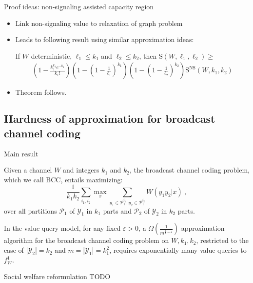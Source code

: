 \documentclass{beamer}
\theoremstyle{definition}
\theoremstyle{remark}
\begin{document}
\begin{frame}{Proof ideas: non-signaling assisted capacity region}
  \begin{itemize}
  \item Link non-signaling value to relaxation of graph problem
  \item Leads to following result using similar approximation ideas:
    \begin{theorem}
      \label{theo:NSdet}
      If $W$ deterministic, $\ell_1 \leq k_1$ and $\ell_2 \leq k_2$, then $\mathrm{S}(W,\ell_1,\ell_2) \geq$
      \begin{align*}
        \left(1 - \frac{k_1^{k_1}e^{-k_1}}{k_1!}\right)\left(1-\left(1-\frac{1}{\ell_1}\right)^{k_1}\right)\left(1-\left(1-\frac{1}{\ell_2}\right)^{k_2}\right)\mathrm{S}^{\mathrm{NS}}(W,k_1,k_2)
      \end{align*}
    \end{theorem}
  \item Theorem follows.
  \end{itemize}
\end{frame}

\subsection{Hardness of approximation for broadcast channel coding}
\begin{frame}{Main result}
  \begin{definition}
  Given a channel $W$ and integers $k_1$ and $k_2$, the broadcast channel coding problem, which we call \textsc{BCC}, entails maximizing:
  \[ \frac{1}{k_1k_2}\sum_{i_1,i_2} \max_x \sum_{y_1 \in \mathcal{P}_1^{i_1}, y_2 \in \mathcal{P}_1^{i_2}} W(y_1y_2|x) \ , \]
  over all partitions $\mathcal{P}_1$ of $\mathcal{Y}_1$ in $k_1$ parts and $\mathcal{P}_2$ of $\mathcal{Y}_2$ in $k_2$ parts.
\end{definition}

  \begin{theorem}
  In the value query model, for any fixed $\varepsilon > 0$, a $\Omega\left(\frac{1}{m^{\frac{1}{2}-\varepsilon}}\right)$-approximation algorithm for the broadcast channel coding problem on $W,k_1,k_2$, restricted to the case of $|\mathcal{Y}_2| = k_2$ and $m = |\mathcal{Y}_1| = k_1^2$, requires exponentially many value queries to $f_W^1$.
  \end{theorem}
\end{frame}

\begin{frame}{Social welfare reformulation}
  TODO
\end{frame}
\end{document}
